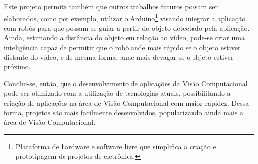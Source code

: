 Este projeto permite também que outros trabalhos futuros possam ser elaborados, como por exemplo, utilizar o Arduino\footnote{Plataforma de hardware e software livre que simplifica a criação e prototipagem de projetos de eletrônica.} visando integrar a aplicação com robôs para que possam se guiar a partir do objeto detectado pela aplicação. Ainda, estimando a distância do objeto em relação ao vídeo, pode-se criar uma inteligência capaz de permitir que o robô ande mais rápido se o objeto estiver distante do vídeo, e de mesma forma, ande mais devagar se o objeto estiver próximo.

Conclui-se, então, que o desenvolvimento de aplicações da Visão Computacional pode ser otimizado com a utilização de tecnologias atuais, possibilitando a criação de aplicações na área de Visão Computacional com maior rapidez. Dessa forma, projetos são mais facilmente desenvolvidos, popularizando ainda mais a área de Visão Computacional.

